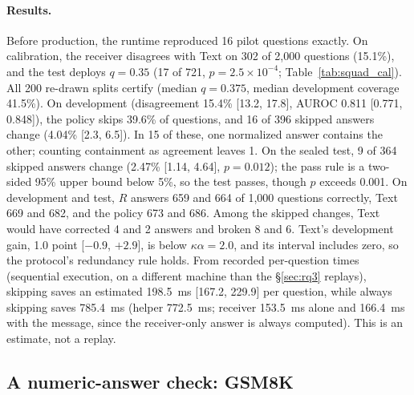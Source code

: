 \paragraph{Results.} Before production, the runtime reproduced 16 pilot questions exactly. On calibration, the receiver disagrees with Text on 302 of 2,000 questions (15.1\%), and the test deploys $q=0.35$ (17 of 721, $p=2.5\times10^{-4}$; Table~\ref{tab:squad_cal}). All 200 re-drawn splits certify (median $q=0.375$, median development coverage 41.5\%). On development (disagreement 15.4\% [13.2, 17.8], AUROC 0.811 [0.771, 0.848]), the policy skips 39.6\% of questions, and 16 of 396 skipped answers change (4.04\% [2.3, 6.5]). In 15 of these, one normalized answer contains the other; counting containment as agreement leaves 1. On the sealed test, 9 of 364 skipped answers change (2.47\% [1.14, 4.64], $p=0.012$); the pass rule is a two-sided 95\% upper bound below 5\%, so the test passes, though $p$ exceeds 0.001. On development and test, $R$ answers 659 and 664 of 1,000 questions correctly, Text 669 and 682, and the policy 673 and 686. Among the skipped changes, Text would have corrected 4 and 2 answers and broken 8 and 6. Text's development gain, 1.0 point [$-0.9$, $+2.9$], is below $\kappa\alpha=2.0$, and its interval includes zero, so the protocol's redundancy rule holds. From recorded per-question times (sequential execution, on a different machine than the \S\ref{sec:rq3} replays), skipping saves an estimated 198.5~ms [167.2, 229.9] per question, while always skipping saves 785.4~ms (helper 772.5~ms; receiver 153.5~ms alone and 166.4~ms with the message, since the receiver-only answer is always computed). This is an estimate, not a replay.

\subsection{A numeric-answer check: GSM8K}\label{app:gsm}

